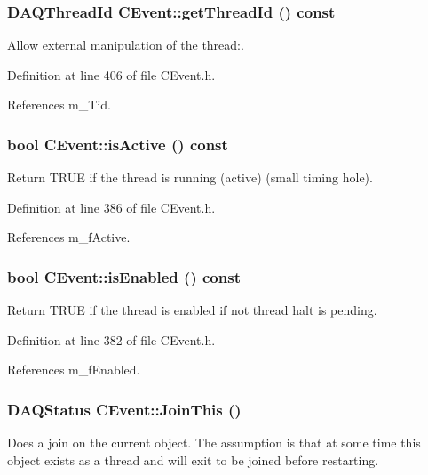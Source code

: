 \subsubsection{\setlength{\rightskip}{0pt plus 5cm}DAQThread\-Id CEvent::get\-Thread\-Id () const\hspace{0.3cm}{\tt  [inline]}}\label{classCEvent_a10}


Allow external manipulation of the thread:.



Definition at line 406 of file CEvent.h.

References m\_\-Tid.
\subsubsection{\setlength{\rightskip}{0pt plus 5cm}bool CEvent::is\-Active () const\hspace{0.3cm}{\tt  [inline]}}\label{classCEvent_a5}


Return TRUE if the thread is running (active) (small timing hole).



Definition at line 386 of file CEvent.h.

References m\_\-f\-Active.
\subsubsection{\setlength{\rightskip}{0pt plus 5cm}bool CEvent::is\-Enabled () const\hspace{0.3cm}{\tt  [inline]}}\label{classCEvent_a4}


Return TRUE if the thread is enabled if not thread halt is pending.



Definition at line 382 of file CEvent.h.

References m\_\-f\-Enabled.
\subsubsection{\setlength{\rightskip}{0pt plus 5cm}DAQStatus CEvent::Join\-This ()\hspace{0.3cm}{\tt  [protected]}}\label{classCEvent_b6}


Does a join on the current object. The assumption is that at some time this object exists as a thread and will exit to be joined before restarting. 


